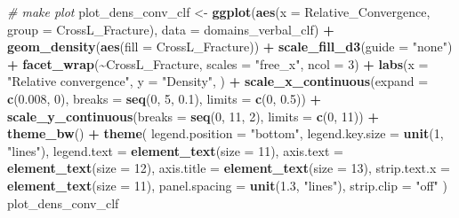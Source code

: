 \documentclass[
]{article}
\newenvironment{Shaded}{\begin{snugshade}}{\end{snugshade}}
\newcommand{\AttributeTok}[1]{\textcolor[rgb]{0.13,0.29,0.53}{#1}}
\newcommand{\CommentTok}[1]{\textcolor[rgb]{0.56,0.35,0.01}{\textit{#1}}}
\newcommand{\DecValTok}[1]{\textcolor[rgb]{0.00,0.00,0.81}{#1}}
\newcommand{\FloatTok}[1]{\textcolor[rgb]{0.00,0.00,0.81}{#1}}
\newcommand{\FunctionTok}[1]{\textcolor[rgb]{0.13,0.29,0.53}{\textbf{#1}}}
\newcommand{\NormalTok}[1]{#1}
\newcommand{\OtherTok}[1]{\textcolor[rgb]{0.56,0.35,0.01}{#1}}
\newcommand{\SpecialCharTok}[1]{\textcolor[rgb]{0.81,0.36,0.00}{\textbf{#1}}}
\newcommand{\StringTok}[1]{\textcolor[rgb]{0.31,0.60,0.02}{#1}}
\begin{document}
\begin{Shaded}
\begin{Highlighting}[]
\CommentTok{\# make plot}
\NormalTok{plot\_dens\_conv\_clf }\OtherTok{\textless{}{-}} \FunctionTok{ggplot}\NormalTok{(}\FunctionTok{aes}\NormalTok{(}\AttributeTok{x =}\NormalTok{ Relative\_Convergence, }\AttributeTok{group =}\NormalTok{ CrossL\_Fracture), }\AttributeTok{data =}\NormalTok{ domains\_verbal\_clf) }\SpecialCharTok{+}
  \FunctionTok{geom\_density}\NormalTok{(}\FunctionTok{aes}\NormalTok{(}\AttributeTok{fill =}\NormalTok{ CrossL\_Fracture)) }\SpecialCharTok{+}
  \FunctionTok{scale\_fill\_d3}\NormalTok{(}\AttributeTok{guide =} \StringTok{"none"}\NormalTok{) }\SpecialCharTok{+}
  \FunctionTok{facet\_wrap}\NormalTok{(}\SpecialCharTok{\textasciitilde{}}\NormalTok{CrossL\_Fracture, }\AttributeTok{scales =} \StringTok{"free\_x"}\NormalTok{, }\AttributeTok{ncol =} \DecValTok{3}\NormalTok{) }\SpecialCharTok{+}
  \FunctionTok{labs}\NormalTok{(}\AttributeTok{x =} \StringTok{"Relative convergence"}\NormalTok{, }\AttributeTok{y =} \StringTok{"Density"}\NormalTok{, ) }\SpecialCharTok{+}
  \FunctionTok{scale\_x\_continuous}\NormalTok{(}\AttributeTok{expand =} \FunctionTok{c}\NormalTok{(}\FloatTok{0.008}\NormalTok{, }\DecValTok{0}\NormalTok{), }\AttributeTok{breaks =} \FunctionTok{seq}\NormalTok{(}\DecValTok{0}\NormalTok{, }\DecValTok{5}\NormalTok{, }\FloatTok{0.1}\NormalTok{), }\AttributeTok{limits =} \FunctionTok{c}\NormalTok{(}\DecValTok{0}\NormalTok{, }\FloatTok{0.5}\NormalTok{)) }\SpecialCharTok{+}
  \FunctionTok{scale\_y\_continuous}\NormalTok{(}\AttributeTok{breaks =} \FunctionTok{seq}\NormalTok{(}\DecValTok{0}\NormalTok{, }\DecValTok{11}\NormalTok{, }\DecValTok{2}\NormalTok{), }\AttributeTok{limits =} \FunctionTok{c}\NormalTok{(}\DecValTok{0}\NormalTok{, }\DecValTok{11}\NormalTok{)) }\SpecialCharTok{+}
  \FunctionTok{theme\_bw}\NormalTok{() }\SpecialCharTok{+}
  \FunctionTok{theme}\NormalTok{(}
    \AttributeTok{legend.position =} \StringTok{"bottom"}\NormalTok{,}
    \AttributeTok{legend.key.size =} \FunctionTok{unit}\NormalTok{(}\DecValTok{1}\NormalTok{, }\StringTok{"lines"}\NormalTok{),}
    \AttributeTok{legend.text =} \FunctionTok{element\_text}\NormalTok{(}\AttributeTok{size =} \DecValTok{11}\NormalTok{),}
    \AttributeTok{axis.text =} \FunctionTok{element\_text}\NormalTok{(}\AttributeTok{size =} \DecValTok{12}\NormalTok{),}
    \AttributeTok{axis.title =} \FunctionTok{element\_text}\NormalTok{(}\AttributeTok{size =} \DecValTok{13}\NormalTok{),}
    \AttributeTok{strip.text.x =} \FunctionTok{element\_text}\NormalTok{(}\AttributeTok{size =} \DecValTok{11}\NormalTok{),}
    \AttributeTok{panel.spacing =} \FunctionTok{unit}\NormalTok{(}\FloatTok{1.3}\NormalTok{, }\StringTok{"lines"}\NormalTok{),}
    \AttributeTok{strip.clip =} \StringTok{"off"}
\NormalTok{  )}
\NormalTok{plot\_dens\_conv\_clf}
\end{Highlighting}
\end{Shaded}
\end{document}
